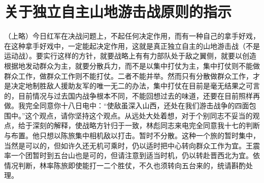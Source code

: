 \section[关于独立自主山地游击战原则的指示（一九三七年九月二十一日）]{关于独立自主山地游击战原则的指示}


（上略）今日红军在决战问题上，不起任何决定作用，而有一种自己的拿手好戏，在这种拿手好戏中，一定能起决定作用，这就是真正独立自主的山地游击战（不是运动战）。要实行这样的方针，就要战略上有有力部队处于敌之翼侧，就要以创造根据地发动群众为主，就要分散兵力，而不是以集中打仗为主，集中打仗则不能做群众工作，做群众工作则不能打仗。二者不能并举。然而只有分散做群众工作，才是决定地制胜敌人援助友军的唯一无二的办法，集中打仗在目前是毫无结果之可言的，目前情况与过去国内战争根本不同，不能回想过去的味道，还要在目前照样再做。我完全同意你十八日电中：“使敌虽深入山西，还处在我们游击战争的四面包围中。”这个观点，请你坚持这个观点。从远处大处着想，对于个别同志不妥当的观点，给于深刻的解释，使战略方针归于一致，林彪同志来电完全同意我十七的判断与布置。他只想以陈旅集中相机敌以打击。暂时不分散。这种一个旅的暂时集中，当然是可以的，但如许久还无机可乘时，仍以适时把中心转向群众工作为宜。王震率一个团暂时到五台山也是可的，但请注意到适当时机，仍以转赴晋西北为宜。依情况判断，林率陈旅即使能打一二个胜仗，不久也须转向五台来的，统请斟酌处理。

